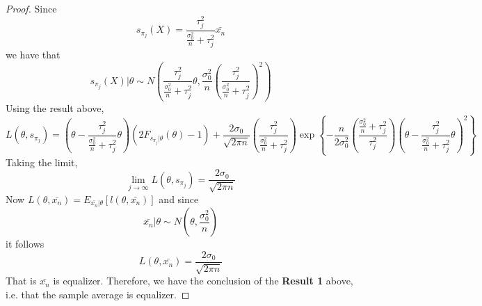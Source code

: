 \documentclass[letterpaper, 12pt]{article}\usepackage[]{graphicx}\usepackage[]{color}
\begin{document}
\begin{proof}
Since
\[
s_{\pi_j}(X) = \frac{\tau_j^2}{\frac{\sigma_0^2}{n} + \tau_j^2} \bar{x_n}
\]
we have that 
\[
s_{\pi_j}(X) | \theta 
\sim 
N
\left(
\frac{\tau_j^2}{\frac{\sigma_0^2}{n} + \tau_j^2} \theta
,
\frac{\sigma_0^2}{n} \left(\frac{\tau_j^2}{\frac{\sigma_0^2}{n} + \tau_j^2}\right)^2
\right)
\]
Using the result above,
\begin{equation}
L(\theta, s_{\pi_j}) = 
(
\theta - \frac{\tau_j^2}{\frac{\sigma_0^2}{n} + \tau_j^2} \theta
)
(2 F_{s_{\pi_j}|\theta}(\theta) - 1) 
+
\frac{2\sigma_0}{\sqrt{2\pi n}}
\left(\frac{\tau_j^2}{\frac{\sigma_0^2}{n} + \tau_j^2}\right)
\exp
\left\{
-\frac{n}{2\sigma_0^2}
\left(\frac{\frac{\sigma_0^2}{n} + \tau_j^2}{\tau_j^2}\right)
\left(\theta
-
\frac{\tau_j^2}{\frac{\sigma_0^2}{n} + \tau_j^2} \theta
\right)^2
\right\}
\end{equation}
Taking the limit,
\[
\lim_{j \to \infty} L(\theta, s_{\pi_j}) = \frac{2\sigma_0}{\sqrt{2\pi n}}
\]
Now $L(\theta, \bar{x_n}) = E_{\bar{x_n}|\theta}[l(\theta, \bar{x_n})]$ and since 
\[
\bar{x_n} | \theta \sim 
N
\left(
\theta, \frac{\sigma_0^2}{n}
\right)
\]
it follows
\[
L(\theta, \bar{x_n}) = 
\frac{2\sigma_0}{\sqrt{2\pi n}}
\]
That is $\bar{x_n}$ is equalizer.
Therefore, we have the conclusion of the \textbf{Result 1} above, i.e. that the sample average is equalizer.
\end{proof}
\end{document}
